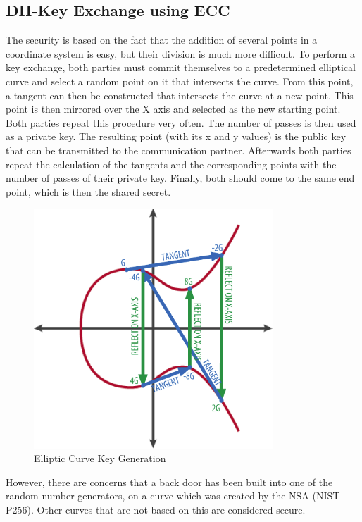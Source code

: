 \documentclass[12pt,oneside,a4paper,parskip]{scrbook}
\begin{document}
\subsection{DH-Key Exchange using ECC}
The security is based on the fact that the addition of several points in a coordinate system is easy, but their division is much more difficult. To perform a key exchange, both parties must commit themselves to a predetermined elliptical curve and select a random point on it that intersects the curve. From this point, a tangent can then be constructed that intersects the curve at a new point. This point is then mirrored over the X axis and selected as the new starting point. Both parties repeat this procedure very often. The number of passes is then used as a private key. The resulting point (with its x and y values) is the public key that can be transmitted to the communication partner. Afterwards both parties repeat the calculation of the tangents and the corresponding points with the number of passes of their private key. Finally, both should come to the same end point, which is then the shared secret.
\parencite{hankerson_elliptic_2011}
\begin{figure}[ht]
 \centering
 \includegraphics[width=0.8\textwidth]{ressources/ecc.png}
 \caption{Elliptic Curve Key Generation \parencite{uszak_elliptic_2017}}
 \label{fig:ecc}
\end{figure}

However, there are concerns that a back door has been built into one of the random number generators, on a curve which was created by the NSA (NIST-P256). Other curves that are not based on this are considered secure. 
\parencite{schneier_essays_2007}
\end{document}
